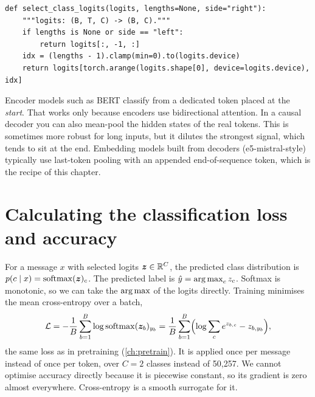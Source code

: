 \begin{lstlisting}[caption={Selecting the per-message logits.},label={lst:classify:select}]
def select_class_logits(logits, lengths=None, side="right"):
    """logits: (B, T, C) -> (B, C)."""
    if lengths is None or side == "left":
        return logits[:, -1, :]
    idx = (lengths - 1).clamp(min=0).to(logits.device)
    return logits[torch.arange(logits.shape[0], device=logits.device), idx]
\end{lstlisting}

\begin{deepdive}
Encoder models such as BERT classify from a dedicated \code{[CLS]} token placed at the
\emph{start}. That works only because encoders use bidirectional attention. In a causal
decoder you can also mean-pool the hidden states of the real tokens. This is sometimes
more robust for long inputs, but it dilutes the strongest signal, which tends to sit at
the end. Embedding models built from decoders (e5-mistral-style) typically use
last-token pooling with an appended end-of-sequence token, which is the recipe of this
chapter.
\end{deepdive}

\section{Calculating the classification loss and accuracy}\label{sec:classify:loss}

For a message $x$ with selected logits $\bm{z}\in\mathbb{R}^{C}$, the predicted class
distribution is $p(c\mid x) = \operatorname{softmax}(\bm{z})_c$. The predicted label is
$\hat{y} = \operatorname*{arg\,max}_c z_c$. Softmax is monotonic, so we can take the $\operatorname*{arg\,max}$ of the
logits directly. Training minimises the mean cross-entropy over a batch,
\begin{equation}
\mathcal{L} = -\frac{1}{B}\sum_{b=1}^{B} \log \operatorname{softmax}(\bm{z}_b)_{y_b}
            = \frac{1}{B}\sum_{b=1}^{B}\Bigl(\log\sum_{c} e^{z_{b,c}} - z_{b,y_b}\Bigr),
\label{eq:classify:ce}
\end{equation}
the same loss as in pretraining (\cref{ch:pretrain}). It is applied once per message
instead of once per token, over $C=2$ classes instead of 50{,}257. We cannot optimise
accuracy directly because it is piecewise constant, so its gradient is zero almost
everywhere. Cross-entropy is a smooth surrogate for it.

